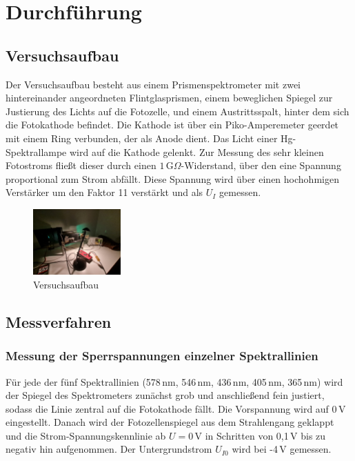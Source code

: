 \chapter{Durchführung}
\label{ch:durchfuerung}

\section{Versuchsaufbau}

Der Versuchsaufbau besteht aus einem Prismenspektrometer mit zwei hintereinander angeordneten Flintglasprismen, einem beweglichen Spiegel zur Justierung des Lichts auf die Fotozelle, und einem Austrittsspalt, hinter dem sich die Fotokathode befindet. Die Kathode ist über ein Piko-Amperemeter geerdet mit einem Ring verbunden, der als Anode dient. Das Licht einer Hg-Spektrallampe wird auf die Kathode gelenkt. Zur Messung des sehr kleinen Fotostroms fließt dieser durch einen $1\,\text{G}\Omega$-Widerstand, über den eine Spannung proportional zum Strom abfällt. Diese Spannung wird über einen hochohmigen Verstärker um den Faktor 11 verstärkt und als $U_I$ gemessen.

\begin{figure}[!ht]
    \centering
    \includegraphics[width=0.3\textwidth]{img/35/va.jpg}
    \caption{Versuchsaufbau}
    \label{fig:v}
\end{figure}

\section{Messverfahren}

\subsection{Messung der Sperrspannungen einzelner Spektrallinien}

Für jede der fünf Spektrallinien (578\,nm, 546\,nm, 436\,nm, 405\,nm, 365\,nm) wird der Spiegel des Spektrometers zunächst grob und anschließend fein justiert, sodass die Linie zentral auf die Fotokathode fällt. Die Vorspannung wird auf 0\,V eingestellt. Danach wird der Fotozellenspiegel aus dem Strahlengang geklappt und die Strom-Spannungskennlinie ab $U=0\,\text{V}$ in Schritten von 0,1\,V bis zu negativ hin aufgenommen. Der Untergrundstrom $U_{I0}$ wird bei -4\,V gemessen.

